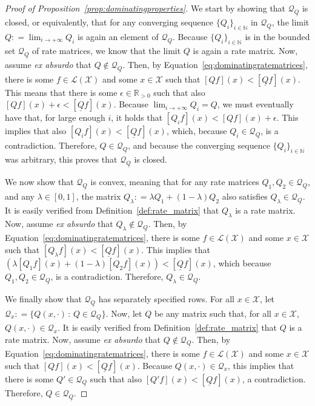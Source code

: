 \documentclass[10pt,a4paper]{paper}
\theoremstyle{definition}
\newcommand{\nats}{\mathbb{N}}
\newcommand{\reals}{\mathbb{R}}
\newcommand{\realspos}{\reals_{>0}}
\newcommand{\states}{\mathcal{X}}
\newcommand{\gambles}{\mathcal{L}}
\newcommand{\gamblesX}{\gambles(\states)}
\newcommand{\rateset}{\mathcal{Q}}
\newcommand{\lrate}{\underline{Q}}
\newcommand{\coloneqq}{:\!=}
\begin{document}
\begin{proof}[Proof of Proposition~\ref{prop:dominatingproperties}]
We start by showing that $\rateset_{\lrate}$ is closed, or equivalently, that for any converging sequence $\{Q_i\}_{i\in\nats}$ in $\rateset_{\lrate}$, the limit $Q\coloneqq\lim_{i\to+\infty}Q_i$ is again an element of $\rateset_{\lrate}$. Because $\{Q_i\}_{i\in\nats}$ is in the bounded set $\rateset_{\lrate}$ of rate matrices, we know that the limit $Q$ is again a rate matrix. Now, assume \emph{ex absurdo} that $Q\notin\rateset_{\lrate}$. Then, by Equation~\eqref{eq:dominatingratematrices}, there is some $f\in\gamblesX$ and some $x\in\states$ such that $\left[Qf\right](x) < \left[\lrate f\right](x)$. This means that there is some $\epsilon\in\realspos$ such that also $\left[Qf\right](x) + \epsilon < \left[\lrate f\right](x)$. Because $\lim_{i\to+\infty}Q_i=Q$, we must eventually have that, for large enough $i$, it holds that $\left[Q_if\right](x) < \left[Qf\right](x) + \epsilon$. This implies that also $\left[Q_if\right](x) < \left[\lrate f\right](x)$, which, because $Q_i\in\rateset_{\lrate}$, is a contradiction. Therefore, $Q\in\rateset_{\lrate}$, and because the converging sequence $\{Q_i\}_{i\in\nats}$ was arbitrary, this proves that $\rateset_{\lrate}$ is closed.

We now show that $\rateset_{\lrate}$ is convex, meaning that for any rate matrices $Q_1,Q_2\in\rateset_{\lrate}$, and any $\lambda\in[0,1]$, the matrix $Q_\lambda\coloneqq\lambda Q_1 + (1-\lambda)Q_2$ also satisfies $Q_\lambda\in\rateset_{\lrate}$. It is easily verified from Definition~\ref{def:rate_matrix} that $Q_\lambda$ is a rate matrix. Now, assume \emph{ex absurdo} that $Q_\lambda\notin\rateset_{\lrate}$. Then, by Equation~\eqref{eq:dominatingratematrices}, there is some $f\in\gamblesX$ and some $x\in\states$ such that $\left[Q_\lambda f\right](x) < \left[\lrate f\right](x)$. This implies that $\left(\lambda\left[Q_1 f\right](x)+(1-\lambda)\left[Q_2 f\right](x)\right) < \left[\lrate f\right](x)$, which because $Q_1,Q_2\in\rateset_{\lrate}$, is a contradiction. Therefore, $Q_\lambda\in\rateset_{\lrate}$.

We finally show that $\rateset_{\lrate}$ has separately specified rows. For all $x\in\states$, let $\rateset_x\coloneqq\{Q(x,\cdot)\,:\,Q\in\rateset_{\lrate}\}$. Now, let $Q$ be any matrix such that, for all $x\in\states$, $Q(x,\cdot)\in\rateset_x$. It is easily verified from Definition~\ref{def:rate_matrix} that $Q$ is a rate matrix. Now, assume \emph{ex absurdo} that $Q\notin\rateset_{\lrate}$. Then, by Equation~\eqref{eq:dominatingratematrices}, there is some $f\in\gamblesX$ and some $x\in\states$ such that $\left[Qf\right](x) < \left[\lrate f\right](x)$. Because $Q(x,\cdot)\in\rateset_x$, this implies that there is some $Q'\in\rateset_{\lrate}$ such that also $\left[Q'f\right](x) < \left[\lrate f\right](x)$, a contradiction. Therefore, $Q\in\rateset_{\lrate}$.
\end{proof}
\end{document}
